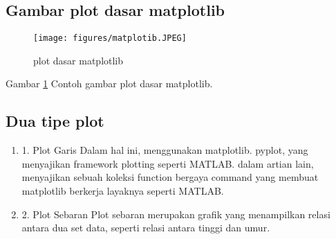 \subsection {Gambar plot dasar matplotlib}
	\begin{figure}[ht]
	\centerline{\texttt{[image: figures/matplotib.JPEG]}}
	\caption{plot dasar matplotlib}
	\label{Gambar}
	\end{figure}
      
      Gambar \ref{Gambar} Contoh gambar plot dasar matplotlib.
	  
\subsection {Dua tipe plot}
\begin{enumerate}
\item 
	1. Plot Garis
		Dalam hal ini, menggunakan matplotlib. pyplot, yang menyajikan framework plotting seperti MATLAB. dalam artian lain, menyajikan sebuah koleksi function bergaya command yang membuat matplotlib berkerja layaknya seperti MATLAB.
\item
	2. Plot Sebaran
		Plot sebaran merupakan grafik yang menampilkan relasi antara dua set data, seperti relasi antara tinggi dan umur.
\end{enumerate}
	  
	  
